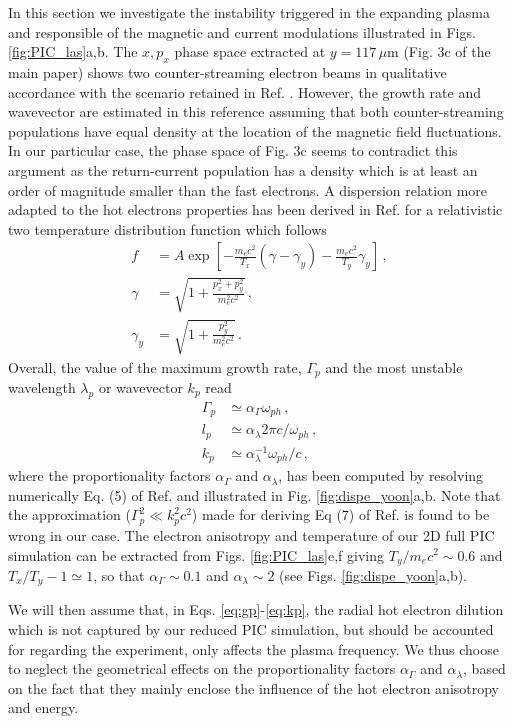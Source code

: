 \documentclass[aps,showpacs,superscriptaddress]{revtex4}
\begin{document}
In this section we investigate the instability triggered in the expanding plasma and responsible of the magnetic and current modulations illustrated in Figs. \ref{fig:PIC_las}a,b. 
The $x,p_x$ phase space extracted at $y=117\, \mu$m (Fig. 3c of the main paper) shows two counter-streaming electron beams in qualitative accordance with the scenario retained in Ref. \cite[]{PRL_Gode_2017}. 
However, the growth rate and wavevector are estimated in this reference assuming that both counter-streaming populations have equal density at the location of the magnetic field fluctuations. 
In our particular case, the phase space of Fig. 3c seems to contradict this argument   as the return-current population has a density which is at least an order of magnitude smaller than the fast electrons.
A dispersion  relation  more adapted to the hot electrons properties has been derived in Ref. \cite[]{POP_Yoon_2007b} for a relativistic two temperature distribution function which follows 
\begin{align}
    f &= A \exp\left[ -\frac{m_ec^2}{T_x}(\gamma -\gamma_y) -\frac{m_ec^2}{T_y}\gamma_y \right]\, , \\
    \gamma &= \sqrt{ 1 + \frac{p_x^2 +p_y^2}{m_e^2c^2}} \, , \\
    \gamma_y &=  \sqrt{ 1 + \frac{p_y^2}{m_e^2c^2}} \, .
\end{align}
Overall, the value of the maximum growth rate,  $\Gamma_p$ and the most unstable wavelength $\lambda_p$ or wavevector $k_p$ read
\begin{align}
   \Gamma_p &\simeq \alpha_\Gamma \omega_{ph}  \label{eq:gp} \, , \\ 
   l_p &\simeq \alpha_\lambda 2\pi c/\omega_{ph} \label{eq:lp}  \, , \\
      k_p &\simeq \alpha_\lambda^{-1} \omega_{ph}/c\label{eq:kp}  \, ,
\end{align}
where the  proportionality factors $\alpha_\Gamma$ and $\alpha_\lambda$, has been computed by resolving numerically Eq. (5) of Ref. \cite[]{POP_Yoon_2007b} and illustrated in Fig. \ref{fig:dispe_yoon}a,b.
Note that the approximation  ($\Gamma_p^2 \ll k_p^2 c^2$) made for deriving Eq (7) of Ref. \cite[]{POP_Yoon_2007b} is found to be wrong in our case.
The electron anisotropy and temperature of our 2D full PIC simulation can be extracted from  Figs. \ref{fig:PIC_las}e,f giving   $T_y/m_ec^2 \sim 0.6$ and $ T_x/T_y -1\simeq 1 $, so that  $\alpha_\Gamma \sim 0.1$ and $\alpha_\lambda \sim 2$ (see Figs. \ref{fig:dispe_yoon}a,b).

We will then assume that, in Eqs. \eqref{eq:gp}-\eqref{eq:kp},  the radial hot electron dilution which is not captured by our reduced PIC simulation, but should be accounted for regarding the experiment, only affects the plasma frequency. 
We thus choose to  neglect the geometrical effects on the proportionality factors $\alpha_\Gamma$ and $\alpha_\lambda$,  based on the fact that they mainly enclose the influence of the hot electron  anisotropy and energy.
\end{document}
